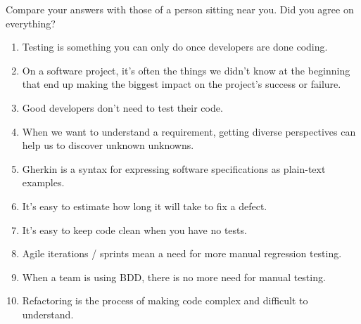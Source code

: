     Compare your answers with those of a person sitting near you. Did you agree on everything?
    
    \begin{enumerate}
    \item Testing is something you can only do once developers are done coding.
    \item On a software project, it's often the things we didn't know at the beginning that end up making the biggest impact on the project's success or failure.
    \item Good developers don't need to test their code.
    \item When we want to understand a requirement, getting diverse perspectives can help us to discover unknown unknowns.
    \item Gherkin is a syntax for expressing software specifications as plain-text examples.
    
    
    \item It's easy to estimate how long it will take to fix a defect.
    \item It's easy to keep code clean when you have no tests.
    \item Agile iterations / sprints mean a need for more manual regression testing.
    \item When a team is using BDD, there is no more need for manual testing.
    \item Refactoring is the process of making code complex and difficult to understand.
    

\end{enumerate}
